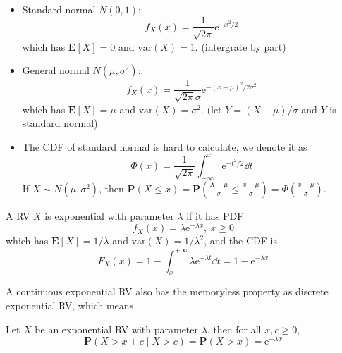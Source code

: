 \begin{definition} ~
    \begin{itemize}
        \item Standard normal $N(0, 1)$:
        \begin{equation}
            f_{X}(x) = \frac{1}{\sqrt{2\pi}} \mathrm{e}^{-x^2/2}
        \end{equation}
        which has $\mathbf{E}[X] = 0$ and $\text{var}(X) = 1$. (intergrate by part)
        \item General normal $N(\mu, \sigma^2)$:
        \begin{equation}
            f_{X}(x) = \frac{1}{\sqrt{2\pi} \sigma} \mathrm{e}^{-(x - \mu)^2/2\sigma^2}
        \end{equation}
        which has $\mathbf{E}[X] = \mu$ and $\text{var}(X) = \sigma^2$. (let $Y = (X - \mu) / \sigma$ and $Y$ is standard normal)
        \item The CDF of standard normal is hard to calculate, we denote it as 
        \begin{equation}
            \Phi(x) = \frac{1}{\sqrt{2\pi}} \int_{-\infty}^{x} \mathrm{e}^{-t^2/2} \dd{t}    
        \end{equation}
        If $X \sim N(\mu, \sigma^2)$, then $\mathbf{P}(X \leq x) = \mathbf{P}(\frac{X - \mu}{\sigma} \leq \frac{x - \mu}{\sigma}) = \Phi(\frac{x - \mu}{\sigma})$.
    \end{itemize}
\end{definition}

\begin{definition}[Exponential RV]
    A RV $X$ is exponential with parameter $\lambda$ if it has PDF
    \begin{equation}
        f_{X}(x) = \lambda \mathrm{e}^{-\lambda x},~ x \geq 0
    \end{equation}
    which has $\mathbf{E}[X] = 1 / \lambda$ and $\text{var}(X) = 1 / \lambda^2$, and the CDF is
    \begin{equation}
        F_{X}(x) = 1 - \int_{x}^{+\infty} \lambda \mathrm{e}^{-\lambda t} \dd{t} = 1 - \mathrm{e}^{-\lambda x}
    \end{equation}
\end{definition}

A continuous exponential RV also has the memoryless property as discrete exponential RV, which means
\begin{property}
    Let $X$ be an exponential RV with parameter $\lambda$, then for all $x, c \geq 0$,
    \begin{equation}
        \mathbf{P}(X > x + c \mid X > c) = \mathbf{P}(X > x) = \mathrm{e}^{-\lambda x}
    \end{equation}
\end{property}


